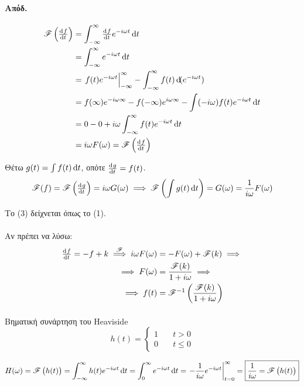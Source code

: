\documentclass[11pt,a4paper,titlepage,final]{article}
\begin{document}
\paragraph{Απόδ.}
\begin{align*}
\mathscr{F}\left(\od{f}{t}\right) &= \int_{-\infty}^\infty \od{f}{t}e^{-i\omega t} \dif t
\\ &=
\int_{-\infty}^\infty e^{-i\omega t} \dif t
\\ &=
\left. f(t)e^{-i\omega t} \right|_{-\infty}^\infty
- \int_{-\infty}^\infty f(t) \dif(e^{-i\omega t})
\\ &=
f(\infty)e^{-i\omega\infty} - f(-\infty)e^{i\omega\infty} - \int (-i\omega)f(t)e^{-i\omega t}\dif t
\\ &= 0 - 0 + i\omega \int_{-\infty}^\infty f(t)e^{-i\omega t} \dif t \\
&= i\omega F(\omega) = \mathscr{F}\left(\od{f}{t}\right)
\end{align*}

Θέτω \(g(t)=\int f(t)\dif t\), οπότε \(\od{g}{t}=f(t)\).
\begin{align*}
\mathscr{F}(f) = \mathscr{F}\left(\od{g}{t}\right) = i\omega G(\omega) \implies
\mathscr{F}\left(\int g(t) \dif t\right) = G(\omega)=\frac{1}{i\omega}F(\omega)
\end{align*}

Το (3) δείχνεται όπως το (1).

\paragraph{}
Αν πρέπει να λύσω:
\begin{align*}
	\od{f}{t} = -f + k \overset{\mathscr F}{\implies} i\omega F(\omega) &= -F(\omega) + \mathscr F(k)
	\implies \\ \implies F(\omega) &= \frac{\mathscr F(k)}{1+i\omega} \implies
	\\ \implies f(t) &= \mathscr F^{-1} \left( \frac{\mathscr F(k)}{1+i\omega} \right)
\end{align*}

\paragraph{}

\begin{defn*}{Βηματική συνάρτηση του \textlatin{Heaviside}}
\[
h(t) = \begin{cases}
1 \quad& t > 0\\
0 \quad& t \leq 0
\end{cases}
\]
\end{defn*}{}
\[
H(\omega)=\mathscr{F}\left(h(t)\right)
= \int_{-\infty}^\infty h(t)e^{-i\omega t} \dif t
= \int_{0}^\infty e^{-i\omega t} \dif t = \left. -\frac{1}{i\omega}e^{-i\omega t}\right|_{t=0}^\infty
= \boxed{
\frac{1}{i\omega}=\mathscr{F}\left(h(t)\right)
}
\]
\end{document}
